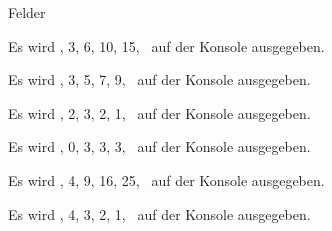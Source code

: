 \begin{exercise}{Felder}
\begin{solution}
\begin{parts}
\item
Es wird , 3, 6, 10, 15, \grqq\ auf der Konsole ausgegeben.

\item
Es wird , 3, 5, 7, 9, \grqq\ auf der Konsole ausgegeben.

\item
Es wird , 2, 3, 2, 1, \grqq\ auf der Konsole ausgegeben.

\item
Es wird , 0, 3, 3, 3, \grqq\ auf der Konsole ausgegeben.

\item
Es wird , 4, 9, 16, 25, \grqq\ auf der Konsole ausgegeben.

\item
Es wird , 4, 3, 2, 1, \grqq\ auf der Konsole ausgegeben.
\end{parts}
\end{solution}
\end{exercise}
